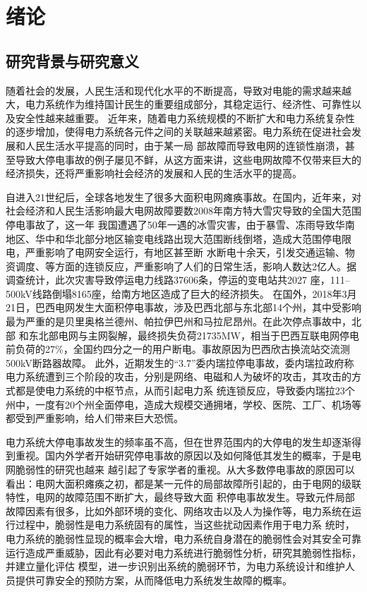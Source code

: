 \chapter{绪论}

\section{研究背景与研究意义}
\label{sec:research_background}
随着社会的发展，人民生活和现代化水平的不断提高，导致对电能的需求越来越大，电力系统作为维持国计民生的重要组成部分，其稳定运行、经济性、可靠性以及安全性越来越重要。
近年来，随着电力系统规模的不断扩大和电力系统复杂性的逐步增加，使得电力系统各元件之间的关联越来越紧密。电力系统在促进社会发展和人民生活水平提高的同时，由于某一局
部故障而导致电网的连锁性崩溃，甚至导致大停电事故的例子屡见不鲜，从这方面来讲，这些电网故障不仅带来巨大的经济损失，还将严重影响社会经济的发展和人民的生活水平的提高。

自进入21世纪后，全球各地发生了很多大面积电网瘫痪事故。在国内，近年来，对社会经济和人民生活影响最大电网故障要数2008年南方特大雪灾导致的全国大范围停电事故了，这一年
我国遭遇了50年一遇的冰雪灾害，由于暴雪、冻雨导致华南地区、华中和华北部分地区输变电线路出现大范围断线倒塔，造成大范围停电限电，严重影响了电网安全运行，有地区甚至断
水断电十余天，引发交通运输、物资调度、等方面的连锁反应，严重影响了人们的日常生活，影响人数达2亿人。据调查统计，此次灾害导致停运电力线路37606条，停运的变电站共2027
座，111--500kV线路倒塌8165座，给南方地区造成了巨大的经济损失。
在国外，2018年3月21日，巴西电网发生大面积停电事故，涉及巴西北部与东北部14个州，其中受影响最为严重的是贝里奥格兰德州、帕拉伊巴州和马拉尼昂州。在此次停点事故中，北部
和东北部电网与主网裂解，最终损失负荷21735MW，相当于巴西互联电网停电前负荷的27\%，全国约四分之一的用户断电。事故原因为巴西欣古换流站交流测500kV断路器故障\cite{refs1}。
此外，近期发生的“3.7”委内瑞拉停电事故，委内瑞拉政府称电力系统遭到三个阶段的攻击，分别是网络、电磁和人为破坏的攻击，其攻击的方式都是使电力系统的中枢节点，从而引起电力系
统连锁反应，导致委内瑞拉23个州中，一度有20个州全面停电，造成大规模交通拥堵，学校、医院、工厂、机场等都受到严重影响，给人们带来巨大恐慌。

电力系统大停电事故发生的频率虽不高，但在世界范围内的大停电的发生却逐渐得到重视。国内外学者开始研究停电事故的原因以及如何降低其发生的概率，于是电网脆弱性的研究也越来
越引起了专家学者的重视。从大多数停电事故的原因可以看出：电网大面积瘫痪之初，都是某一元件的局部故障所引起的，由于电网的级联特性，电网的故障范围不断扩大，最终导致大面
积停电事故发生。导致元件局部故障因素有很多，比如外部环境的变化、网络攻击以及人为操作等，电力系统在运行过程中，脆弱性是电力系统固有的属性，当这些扰动因素作用于电力系
统时，电力系统的脆弱性显现的概率会大增，电力系统自身潜在的脆弱性会对其安全可靠运行造成严重威胁，因此有必要对电力系统进行脆弱性分析，研究其脆弱性指标，并建立量化评估
模型，进一步识别出系统的脆弱环节，为电力系统设计和维护人员提供可靠安全的预防方案，从而降低电力系统发生故障的概率。
